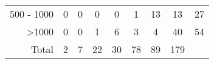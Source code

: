\begin{table}[ht!]
{\begin{tabular}{r|ccccccc|c}
            500 - 1000                                            & 0                                                & 0                         & 0                          & 0                          & \cellcolor[HTML]{FFFDFA}1  & \cellcolor[HTML]{FFEABF}13 & \cellcolor[HTML]{FFEABF}13 & 27                                              \\
            \textgreater 1000                                     & 0                                                & 0                         & \cellcolor[HTML]{FFFDFA}1  & \cellcolor[HTML]{FFF5E1}6  & \cellcolor[HTML]{FFFAF0}3  & \cellcolor[HTML]{FFF8EB}4  & \cellcolor[HTML]{FFBD39}40 & 54                                              \\ \hline
            Total                                                 & 2                                                & 7                         & 22                         & 30                         & 78                         & 89                         & 179                        &                                                 \\ \hline
        \end{tabular}%
    }
\end{table}